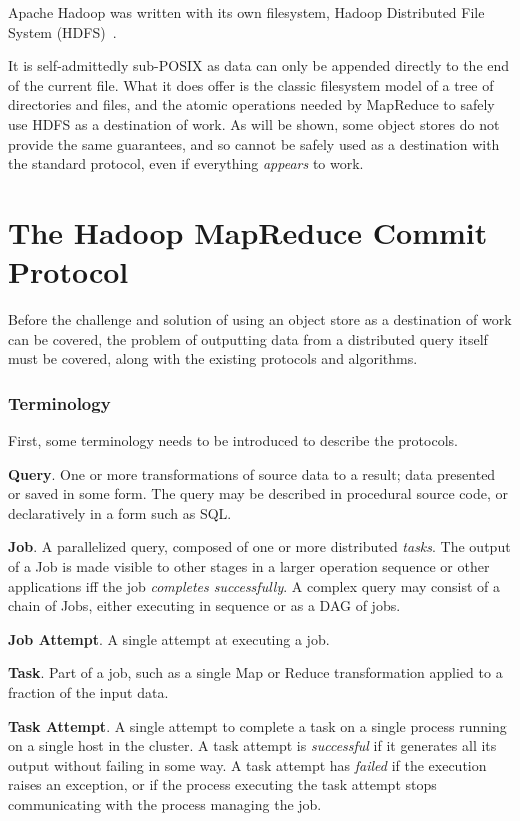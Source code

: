 \documentclass[conference]{IEEEtran}
\begin{document}
Apache Hadoop was written with its own filesystem, Hadoop Distributed File System
(HDFS)\ \cite{Chansler2011}.

It is self-admittedly sub-POSIX as data can only be
appended directly to the end of the current file.
What it does offer is the classic filesystem model of
a tree of directories and files,
and the atomic operations needed by MapReduce to safely use HDFS
as a destination of work.
As will be shown, some object stores do not provide the same guarantees,
and so cannot be safely used as a destination with the standard protocol,
even if everything \emph{appears} to work.



\section{The Hadoop MapReduce Commit Protocol}
\label{sec:hadoop-mr-commit}

Before the challenge and solution of using an object store as a destination
of work can be covered, the problem of outputting data from a distributed
query itself must be covered, along with the existing protocols and algorithms.


\subsubsection{Terminology}

First, some terminology needs to be introduced to describe
the protocols.


\textbf{Query}.
One or more transformations of source data to a result;
data presented or saved in some form.
The query may be described in procedural source code,
or declaratively in a form such as SQL\@.


\textbf{Job}.
A parallelized query, composed of one or more distributed \emph{tasks}.
The output of a Job is made visible to other stages in a larger operation
sequence or other applications iff the job \emph{completes successfully}.
A complex query may consist of a chain of Jobs, either executing in sequence
or as a DAG of jobs.

\textbf{Job Attempt}.
A single attempt at executing a job.

\textbf{Task}.
Part of a job, such as a single Map or Reduce transformation applied to a fraction
of the input data.


\textbf{Task Attempt}.
A single attempt to complete a task on a single process running on a single host
in the cluster.
A task attempt is \emph{successful} if it generates all its output without
failing in some way.
A task attempt has \emph{failed} if the execution raises an exception, or
if the process executing the task attempt stops communicating with
the process managing the job.
\end{document}

